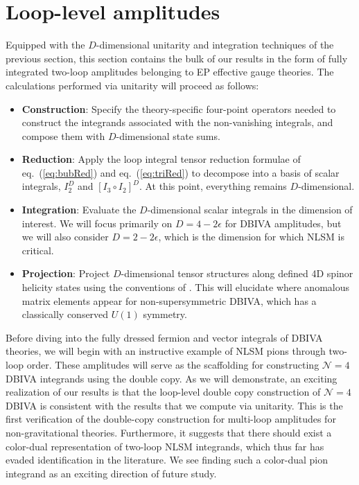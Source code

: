 \documentclass[12pt,letter]{article}
\def\eqn#1{eq.~(\ref{#1})}
\begin{document}
\section{Loop-level amplitudes}\label{sec:Loops}
Equipped with the $D$-dimensional unitarity and integration techniques of the previous section, this section contains the bulk of our results in the form of fully integrated two-loop amplitudes belonging to EP effective gauge theories. The calculations performed via unitarity will proceed as follows:
\begin{itemize}
\item \textbf{Construction}: Specify the theory-specific four-point operators needed to construct the integrands associated with the non-vanishing integrals, and compose them with $D$-dimensional state sums. 
\item \textbf{Reduction}: Apply the loop integral tensor reduction formulae of \eqn{eq:bubRed} and \eqn{eq:triRed} to decompose into a basis of scalar integrals, $I^D_2$ and $[I_3\circ I_2]^D$. At this point, everything remains $D$-dimensional. 
\item \textbf{Integration}: Evaluate the $D$-dimensional scalar integrals in the dimension of interest. We will focus primarily on $D=4-2\epsilon$ for DBIVA amplitudes, but we will also consider $D=2-2\epsilon$, which is the dimension for which NLSM is critical. 
\item \textbf{Projection}: Project $D$-dimensional tensor structures along defined 4D spinor helicity states using the conventions of \cite{jjmcTASI2014}. This will elucidate where anomalous matrix elements appear for non-supersymmetric DBIVA, which has a classically conserved $U(1)$ symmetry. 
\end{itemize}
Before diving into the fully dressed fermion and vector integrals of DBIVA theories, we will begin with an instructive example of NLSM pions through two-loop order. These amplitudes will serve as the scaffolding for constructing $\mathcal{N}=4$ DBIVA integrands using the double copy. As we will demonstrate, an exciting realization of our results is that the loop-level double copy construction of $\mathcal{N}=4$ DBIVA is consistent with the results that we compute via unitarity. This is the first verification of the double-copy construction for multi-loop amplitudes for non-gravitational theories. Furthermore, it suggests that there should exist a color-dual representation of two-loop NLSM integrands, which thus far has evaded identification in the literature. We see finding such a color-dual pion integrand as an exciting direction of future study.   
\end{document}
